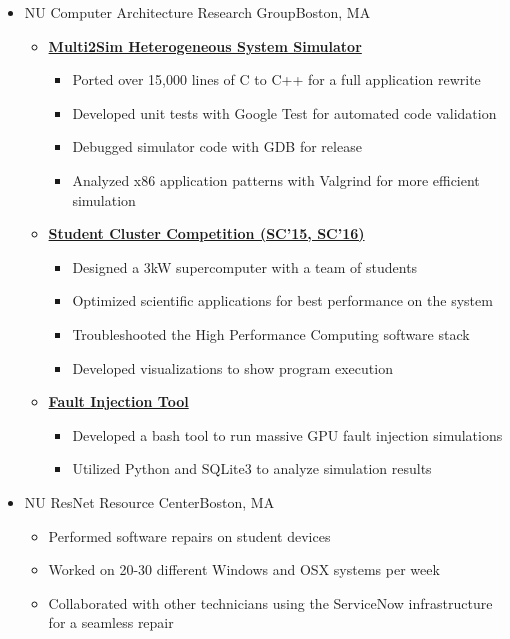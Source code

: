 \documentclass[11pt,letterpaper,sans]{moderncv}
\begin{document}
\begin{itemize}
\item[] {
{NU Computer Architecture Research Group}{Boston, MA}{}{\vspace{3pt}}
\vspace{-3mm}	\begin{itemize}
	\item \textbf{\href{http://multi2sim.org}{Multi2Sim Heterogeneous System Simulator}}
		\begin{itemize}
		\item Ported over 15,000 lines of C to C++ for a full application rewrite
		\item Developed unit tests with Google Test for automated code validation
		\item Debugged simulator code with GDB for release
		\item Analyzed x86 application patterns with Valgrind for more efficient simulation
		\end{itemize}
	\item \textbf{\href{studentclustercompetition.us}{Student Cluster Competition (SC'15, SC'16)}}
		\begin{itemize}
		\item Designed a 3kW supercomputer with a team of students
		\item Optimized scientific applications for best performance on the system
		\item Troubleshooted the High Performance Computing software stack 
		\item Developed visualizations to show program execution
		\end{itemize}
	\item \textbf{\href{https://github.com/spencerhance/multi2sim-FaultInjectionTool}{Fault Injection Tool}}
		\begin{itemize}
		\item Developed a bash tool to run massive GPU fault injection simulations
		\item Utilized Python and SQLite3 to analyze simulation results
		\end{itemize}
		
\end{itemize}		
}
\vspace{6pt}

\item[] {
{NU ResNet Resource Center}{Boston, MA}{}{\vspace{3pt}}
\vspace{-3mm}	\begin{itemize}
	 \item Performed software repairs on student devices
	 \item Worked on 20-30 different Windows and OSX systems per week
	 \item Collaborated with other technicians using the ServiceNow 
infrastructure for a seamless repair
	\end{itemize}
}
\vspace{6pt}


\end{itemize}
\end{document}
